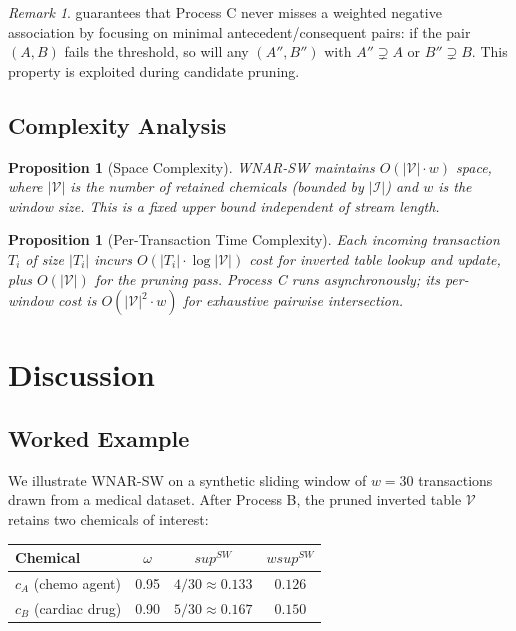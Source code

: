 \documentclass[10pt,twocolumn]{article}
\theoremstyle{plain}
\newtheorem{proposition}[theorem]{Proposition}
\theoremstyle{definition}
\theoremstyle{remark}
\newtheorem{remark}{Remark}[section]
\newcommand{\wsup}{\mathit{wsup}}
\newcommand{\SW}{\mathit{SW}}
\begin{document}
\begin{remark}
 guarantees that Process C never misses a weighted
negative association by focusing on minimal antecedent/consequent
pairs: if the pair $(A, B)$ fails the threshold, so will any
$(A'', B'')$ with $A'' \supsetneq A$ or $B'' \supsetneq B$.
This property is exploited during candidate pruning.
\end{remark}

\subsection{Complexity Analysis}

\begin{proposition}[Space Complexity]
WNAR-SW maintains $O(|\mathcal{V}| \cdot w)$ space, where
$|\mathcal{V}|$ is the number of retained chemicals (bounded by
$|\mathcal{I}|$) and $w$ is the window size.
This is a fixed upper bound independent of stream length.
\end{proposition}

\begin{proposition}[Per-Transaction Time Complexity]
Each incoming transaction $T_i$ of size $|T_i|$ incurs
$O(|T_i| \cdot \log|\mathcal{V}|)$ cost for inverted table lookup
and update, plus $O(|\mathcal{V}|)$ for the pruning pass.
Process C runs asynchronously; its per-window cost is
$O(|\mathcal{V}|^2 \cdot w)$ for exhaustive pairwise intersection.
\end{proposition}

\section{Discussion}
\label{sec:discussion}

\subsection{Worked Example}
\label{subsec:example}

We illustrate WNAR-SW on a synthetic sliding window of $w = 30$
transactions drawn from a medical dataset.
After Process B, the pruned inverted table $\mathcal{V}$ retains two
chemicals of interest:

\smallskip
\begin{center}
\small
\begin{tabular}{@{}lccc@{}}
  \toprule
  Chemical & $\omega$ & $\mathit{sup}^{\SW}$ & $\wsup^{\SW}$ \\
  \midrule
  $c_A$ (chemo agent) & 0.95 & $4/30 \approx 0.133$ & $0.126$ \\
  $c_B$ (cardiac drug) & 0.90 & $5/30 \approx 0.167$ & $0.150$ \\
  \bottomrule
\end{tabular}
\end{center}
\smallskip
\end{document}

